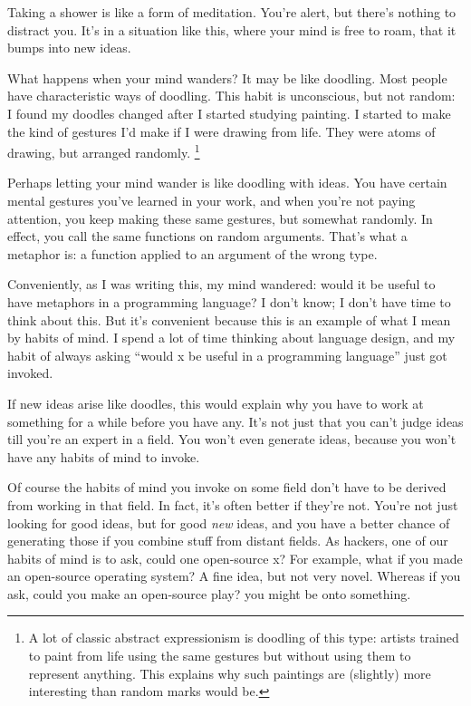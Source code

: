 \documentclass[12pt]{book}
\begin{document}
Taking a shower is like a form of meditation. You're alert, but there's
nothing to distract you. It's in a situation like this, where your mind
is free to roam, that it bumps into new ideas.

What happens when your mind wanders? It may be like doodling. Most
people have characteristic ways of doodling. This habit is unconscious,
but not random: I found my doodles changed after I started studying
painting. I started to make the kind of gestures I'd make if I were
drawing from life. They were atoms of drawing, but arranged randomly.
\footnote{A lot of classic abstract expressionism is doodling of this
type: artists trained to paint from life using the same gestures but
without using them to represent anything. This explains why such
paintings are (slightly) more interesting than random marks would be.}

Perhaps letting your mind wander is like doodling with ideas. You have
certain mental gestures you've learned in your work, and when you're not
paying attention, you keep making these same gestures, but somewhat
randomly. In effect, you call the same functions on random arguments.
That's what a metaphor is: a function applied to an argument of the
wrong type.

Conveniently, as I was writing this, my mind wandered: would it be
useful to have metaphors in a programming language? I don't know; I
don't have time to think about this. But it's convenient because this is
an example of what I mean by habits of mind. I spend a lot of time
thinking about language design, and my habit of always asking ``would x
be useful in a programming language'' just got invoked.

If new ideas arise like doodles, this would explain why you have to work
at something for a while before you have any. It's not just that you
can't judge ideas till you're an expert in a field. You won't even
generate ideas, because you won't have any habits of mind to invoke.

Of course the habits of mind you invoke on some field don't have to be
derived from working in that field. In fact, it's often better if
they're not. You're not just looking for good ideas, but for good
\emph{new} ideas, and you have a better chance of generating those if
you combine stuff from distant fields. As hackers, one of our habits of
mind is to ask, could one open-source x? For example, what if you made
an open-source operating system? A fine idea, but not very novel.
Whereas if you ask, could you make an open-source play? you might be
onto something.
\end{document}
